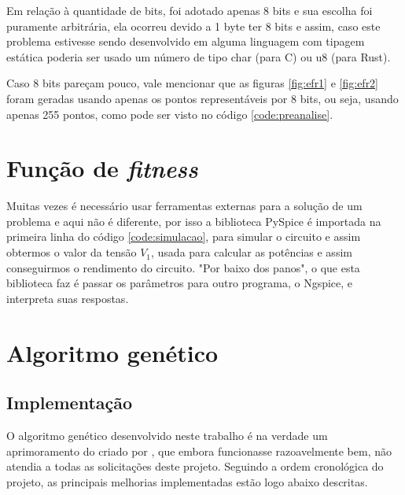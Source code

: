\documentclass[12pt]{article}
\begin{document}
Em relação à quantidade de bits, foi adotado apenas 8 bits e sua escolha foi puramente arbitrária, ela ocorreu devido a 1 byte ter 8 bits e assim, caso este problema estivesse sendo desenvolvido em alguma linguagem com tipagem estática poderia ser usado um número de tipo char (para C) ou u8 (para Rust).

Caso 8 bits pareçam pouco, vale mencionar que as figuras \ref{fig:efr1} e \ref{fig:efr2} foram geradas usando apenas os pontos representáveis por 8 bits, ou seja, usando apenas 255 pontos, como pode ser visto no código \ref{code:preanalise}.

\section{Função de \textit{fitness}}



Muitas vezes é necessário usar ferramentas externas para a solução de um problema e aqui não é diferente, por isso a biblioteca PySpice é importada na primeira linha do código \ref{code:simulacao}, para simular o circuito e assim obtermos o valor da tensão $V_1$, usada para calcular as potências e assim conseguirmos o rendimento do circuito. "Por baixo dos panos", o que esta biblioteca faz é passar os parâmetros para outro programa, o Ngspice, e interpreta suas respostas.

\section{Algoritmo genético}

\subsection{Implementação}



O algoritmo genético desenvolvido neste trabalho é na verdade um aprimoramento do criado por , que embora funcionasse razoavelmente bem, não atendia a todas as solicitações deste projeto. Seguindo a ordem cronológica do projeto, as principais melhorias implementadas estão logo abaixo descritas.
\end{document}
